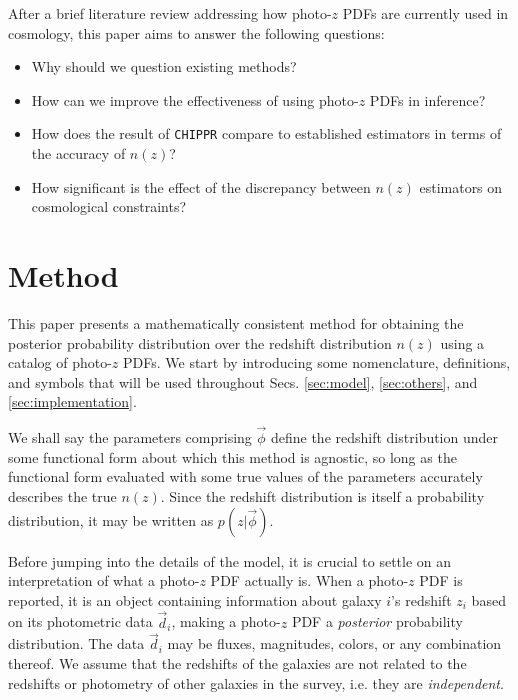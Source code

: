 \documentclass[iop]{emulateapj}
\newcommand{\chippr}{\texttt{CHIPPR} }
\begin{document}
After a brief literature review addressing how photo-$z$ PDFs are currently 
used in cosmology, this paper aims to answer the following questions:

\begin{itemize}
	\item Why should we question existing methods?
	\item How can we improve the effectiveness of using photo-$z$ PDFs in 
inference?
	\item How does the result of \chippr compare to established estimators 
in terms of the accuracy of $n(z)$?
	\item How significant is the effect of the discrepancy between $n(z)$ 
estimators on cosmological constraints?
\end{itemize}

\section{Method}
\label{sec:method}

This paper presents a mathematically consistent method for obtaining the 
posterior probability distribution over the redshift distribution $n(z)$ using 
a catalog of photo-$z$ PDFs.  We start by introducing some nomenclature, 
definitions, and symbols that will be used throughout Secs. \ref{sec:model}, 
\ref{sec:others}, and \ref{sec:implementation}.

We shall say the parameters comprising $\vec{\phi}$ define the redshift 
distribution under some functional form about which this method is agnostic, so 
long as the functional form evaluated with some true values of the parameters 
accurately describes the true $n(z)$.  Since the redshift distribution is 
itself a probability distribution, it may be written as $p(z | \vec{\phi})$.

Before jumping into the details of the model, it is crucial to settle on an 
interpretation of what a photo-$z$ PDF actually is.  When a photo-$z$ PDF is 
reported, it is an object containing information about galaxy $i$'s redshift 
$z_{i}$ based on its photometric data $\vec{d}_{i}$, making a photo-$z$ PDF a 
\textit{posterior} probability distribution.  The data $\vec{d}_{i}$ may be 
fluxes, magnitudes, colors, or any combination thereof.  We assume that the 
redshifts of the galaxies are not related to the redshifts or photometry of 
other galaxies in the survey, i.e. they are \textit{independent}.
\end{document}
